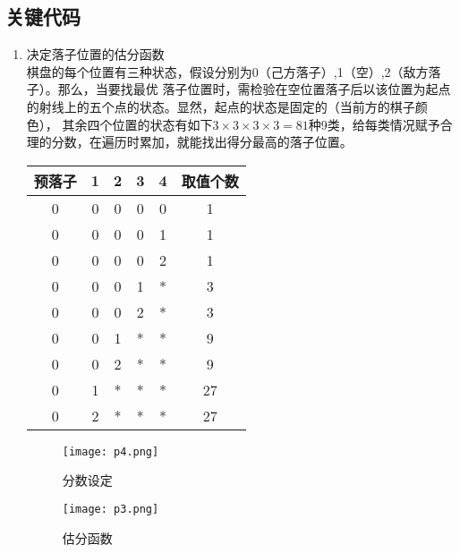\documentclass[UTF8,a4paper,12pt]{article}
\begin{document}
\subsection{关键代码}
\begin{enumerate}[itemindent=0.5em,label=\arabic*、]
  \item 决定落子位置的估分函数\\
  棋盘的每个位置有三种状态，假设分别为0（己方落子）,1（空）,2（敌方落子）。那么，当要找最优
  落子位置时，需检验在空位置落子后以该位置为起点的射线上的五个点的状态。显然，起点的状态是固定的（当前方的棋子颜色），
  其余四个位置的状态有如下$3 \times 3 \times 3 \times 3 = 81$种9类，给每类情况赋予合理的分数，在遍历时累加，就能找出得分最高的落子位置。
  \begin{center}
    \begin{tabular}{cccccc}
    \hline
    预落子 & 1 & 2 & 3 & 4 & 取值个数\\
    \hline
    0 & 0 & 0 & 0 & 0 & 1\\
    0 & 0 & 0 & 0 & 1 & 1\\
    0 & 0 & 0 & 0 & 2 & 1\\
    0 & 0 & 0 & 1 & * & 3\\
    0 & 0 & 0 & 2 & * & 3\\
    0 & 0 & 1 & * & * & 9\\
    0 & 0 & 2 & * & * & 9\\
    0 & 1 & * & * & * & 27\\
    0 & 2 & * & * & * & 27\\
    \hline
    \end{tabular}
  \end{center}
  \begin{figure}[h]
  \begin{center}
  \texttt{[image: p4.png]} %
  \caption{分数设定}
  \end{center}
  \end{figure}
  \begin{figure}[h]
  \begin{center}
  \texttt{[image: p3.png]} %
  \caption{估分函数}
  \end{center}
  \end{figure}
\end{enumerate}
\end{document}
